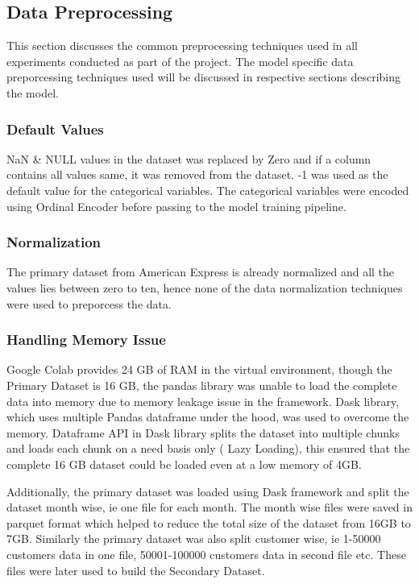 \documentclass[twoside,11pt,a4paper]{article}
\begin{document}
\subsection{Data Preprocessing} 
This section discusses the common preprocessing techniques used in all experiments conducted as part of the project. The model specific data preporcessing techniques used will be discussed in respective sections describing the model.

\subsubsection{Default Values}
NaN \& NULL values in the dataset was replaced by Zero and if a column contains all values same, it was removed from the dataset. -1 was used as the default value for the categorical variables. The categorical variables were encoded using Ordinal Encoder before passing to the model training pipeline.

\subsubsection{Normalization}
The primary dataset from American Express is already normalized and all the values lies between zero to ten, hence none of the data normalization techniques were used to preporcess the data.
\subsubsection{Handling Memory Issue}
Google Colab provides 24 GB of \acf{RAM} in the  virtual environment, though the Primary Dataset is 16 GB,  the pandas library was unable to load the complete data into memory due to memory leakage issue in the framework. Dask library, which uses multiple Pandas dataframe under the hood, was used to overcome the memory. Dataframe API in Dask library splits the dataset into multiple chunks and loads each chunk on a need basis only ( Lazy Loading), this ensured that the complete 16 GB dataset could be loaded even at a low memory of 4GB.

Additionally, the primary dataset was loaded using Dask framework and split the dataset month wise, ie one file for each month. The month wise files were saved in parquet format which helped to reduce the total size of the dataset from 16GB to 7GB. Similarly the primary dataset was also split customer wise, ie 1-50000 customers data in one file, 50001-100000 customers data in second file etc. These files were later used to build the Secondary Dataset.
\end{document}
